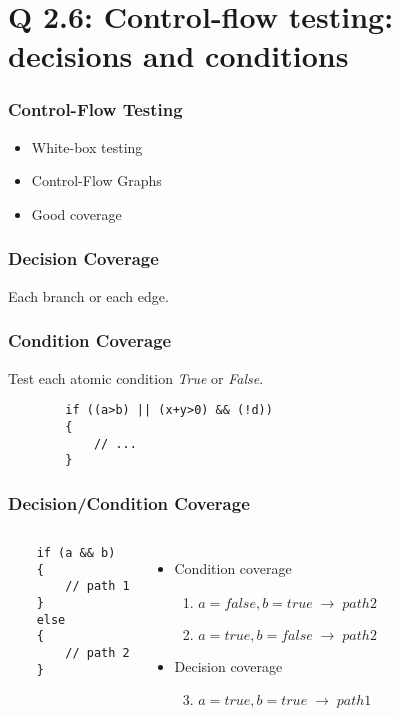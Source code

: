 
\section{Q 2.6: Control-flow testing: decisions and conditions}

\begin{frame}
    \frametitle{Control-Flow Testing}
    \begin{itemize}
        \item White-box testing
        \item Control-Flow Graphs
        \item Good coverage
    \end{itemize}
\end{frame}

\begin{frame}
    \frametitle{Decision Coverage}
    Each branch or each edge.
\end{frame}

\begin{frame}[fragile]
    \frametitle{Condition Coverage}
    Test each atomic condition \emph{True} or \emph{False}.
    \begin{verbatim}
        if ((a>b) || (x+y>0) && (!d))
        {
            // ...
        }
    \end{verbatim}
\end{frame}

\begin{frame}[fragile]
    \frametitle{Decision/Condition Coverage}
    \begin{columns}
        \begin{verbatim}
    if (a && b)
    {
        // path 1
    }
    else
    {
        // path 2
    }
        \end{verbatim}

        \begin{itemize}
            \item Condition coverage
                \begin{enumerate}
                    \item $a = false, b = true \;\rightarrow\; path 2$
                    \item $a = true, b = false \;\rightarrow\; path 2$
                \end{enumerate}
            \item Decision coverage
                \begin{enumerate}
                    \setcounter{enumi}{2}
                    \item $a = true, b = true \;\rightarrow\; path 1$
                \end{enumerate}
        \end{itemize}
    \end{columns}
\end{frame}

